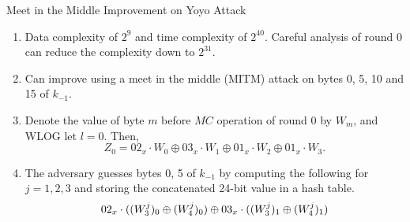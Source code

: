 \documentclass[notheorems]{beamer}
\theoremstyle{definition}
\theoremstyle{example}
\begin{document}
    \begin{frame}[<+->]{Meet in the Middle Improvement on Yoyo Attack}
        \begin{enumerate}
            \item Data complexity of \(2^9\) and time complexity of \(2^{40}\).
            Careful analysis of round 0 can reduce the complexity down to
            \(2^{31}\).
            \item Can improve using a meet in the middle (MITM) attack on bytes
            0, 5, 10 and 15 of \(k_{-1}\).
            \item Denote the value of byte \(m\) before \(MC\) operation of
            round 0 by \(W_m\), and WLOG let \(l = 0\). Then,
            \begin{equation}
                Z_0 = 02_x \cdot W_0 \oplus 03_x \cdot W_1 \oplus 01_x \cdot W_2 \oplus 01_x \cdot W_3.
                \label{eq:mitm}
            \end{equation}
            \item The adversary guesses bytes 0, 5 of \(k_{-1}\) by computing
            the following for \(j = 1, 2, 3\) and storing the concatenated
            24-bit value in a hash table.
            \begin{equation}
                02_x \cdot ((W_3^j)_0 \oplus (W_4^j)_0) \oplus 03_x \cdot ((W_3^j)_1 \oplus (W_4^j)_1)
                \label{eq:mitm-0-5}
            \end{equation}
            \seti
        \end{enumerate} 
    \end{frame}
\end{document}
